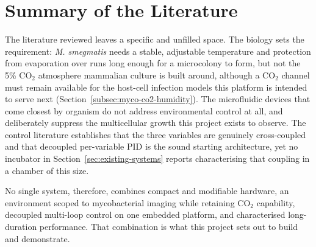 \section{Summary of the Literature}
\label{sec:review-summary}

The literature reviewed leaves a specific and unfilled space. The biology sets the requirement: \textit{M. smegmatis} needs a stable, adjustable temperature and protection from evaporation over runs long enough for a microcolony to form, but not the 5\% CO$_2$ atmosphere mammalian culture is built around, although a CO$_2$ channel must remain available for the host-cell infection models this platform is intended to serve next (Section~\ref{subsec:myco-co2-humidity}). The microfluidic devices that come closest by organism do not address environmental control at all, and deliberately suppress the multicellular growth this project exists to observe. The control literature establishes that the three variables are genuinely cross-coupled and that decoupled per-variable PID is the sound starting architecture, yet no incubator in Section~\ref{sec:existing-systems} reports characterising that coupling in a chamber of this size.

No single system, therefore, combines compact and modifiable hardware, an environment scoped to mycobacterial imaging while retaining CO$_2$ capability, decoupled multi-loop control on one embedded platform, and characterised long-duration performance. That combination is what this project sets out to build and demonstrate.